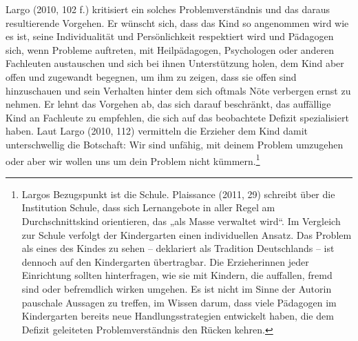 Largo (2010, 102 f.) kritisiert ein solches Problemverständnis und das daraus resultierende Vorgehen. Er wünscht sich, dass das Kind so angenommen wird wie es ist, seine Individualität und Persönlichkeit respektiert wird und Pädagogen sich, wenn Probleme auftreten, mit Heilpädagogen, Psychologen oder anderen Fachleuten austauschen und sich bei ihnen Unterstützung holen, dem Kind aber offen und zugewandt begegnen, um ihm zu zeigen, dass sie offen sind hinzuschauen und sein Verhalten hinter dem sich oftmals Nöte verbergen ernst zu nehmen. Er lehnt das Vorgehen ab, das sich darauf beschränkt, das auffällige Kind an Fachleute zu empfehlen, die sich auf das beobachtete Defizit spezialisiert haben. Laut Largo (2010, 112) vermitteln die Erzieher dem Kind damit unterschwellig die Botschaft: Wir sind unfähig, mit deinem Problem umzugehen oder aber wir wollen uns um dein Problem nicht kümmern.\footnote{Largos Bezugspunkt ist die Schule. Plaissance (2011, 29) schreibt über die Institution Schule, dass sich Lernangebote in aller Regel am Durchschnittskind orientieren, das „als Masse verwaltet wird“. Im Vergleich zur Schule verfolgt der Kindergarten einen individuellen Ansatz. Das Problem als eines des Kindes zu sehen -- deklariert als Tradition Deutschlands -- ist dennoch auf den Kindergarten übertragbar. Die Erzieherinnen jeder Einrichtung sollten hinterfragen, wie sie mit Kindern, die auffallen, fremd sind oder befremdlich wirken umgehen. Es ist nicht im Sinne der Autorin pauschale Aussagen zu treffen, im Wissen darum, dass viele Pädagogen im Kindergarten bereits neue Handlungsstrategien entwickelt haben, die dem Defizit geleiteten Problemverständnis den Rücken kehren.} 

